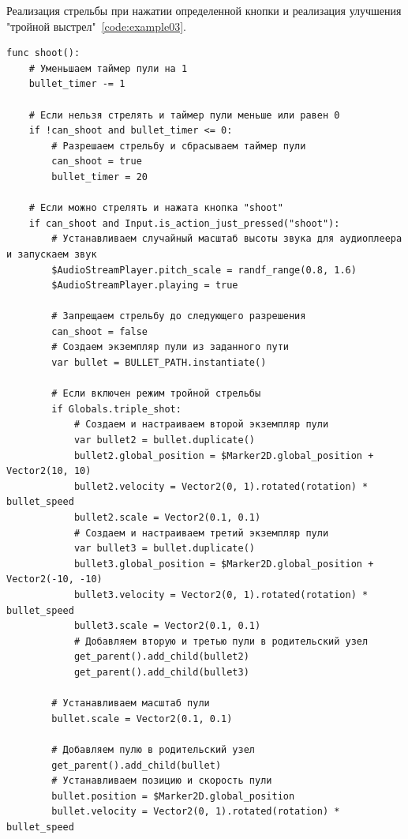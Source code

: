 Реализация стрельбы при нажатии определенной кнопки и реализация улучшения "тройной выстрел"~\ref{code:example03}.
\begin{code}
\vspace{-\baselineskip}\begin{verbatim}
func shoot():
    # Уменьшаем таймер пули на 1
    bullet_timer -= 1

    # Если нельзя стрелять и таймер пули меньше или равен 0
    if !can_shoot and bullet_timer <= 0:
        # Разрешаем стрельбу и сбрасываем таймер пули
        can_shoot = true
        bullet_timer = 20

    # Если можно стрелять и нажата кнопка "shoot"
    if can_shoot and Input.is_action_just_pressed("shoot"):
        # Устанавливаем случайный масштаб высоты звука для аудиоплеера и запускаем звук
        $AudioStreamPlayer.pitch_scale = randf_range(0.8, 1.6)
        $AudioStreamPlayer.playing = true

        # Запрещаем стрельбу до следующего разрешения
        can_shoot = false
        # Создаем экземпляр пули из заданного пути
        var bullet = BULLET_PATH.instantiate()

        # Если включен режим тройной стрельбы
        if Globals.triple_shot:
            # Создаем и настраиваем второй экземпляр пули
            var bullet2 = bullet.duplicate()
            bullet2.global_position = $Marker2D.global_position + Vector2(10, 10)
            bullet2.velocity = Vector2(0, 1).rotated(rotation) * bullet_speed
            bullet2.scale = Vector2(0.1, 0.1)
            # Создаем и настраиваем третий экземпляр пули
            var bullet3 = bullet.duplicate()
            bullet3.global_position = $Marker2D.global_position + Vector2(-10, -10)
            bullet3.velocity = Vector2(0, 1).rotated(rotation) * bullet_speed
            bullet3.scale = Vector2(0.1, 0.1)
            # Добавляем вторую и третью пули в родительский узел
            get_parent().add_child(bullet2)
            get_parent().add_child(bullet3)

        # Устанавливаем масштаб пули
        bullet.scale = Vector2(0.1, 0.1)

        # Добавляем пулю в родительский узел
        get_parent().add_child(bullet)
        # Устанавливаем позицию и скорость пули
        bullet.position = $Marker2D.global_position
        bullet.velocity = Vector2(0, 1).rotated(rotation) * bullet_speed

\end{verbatim}
\end{code}

